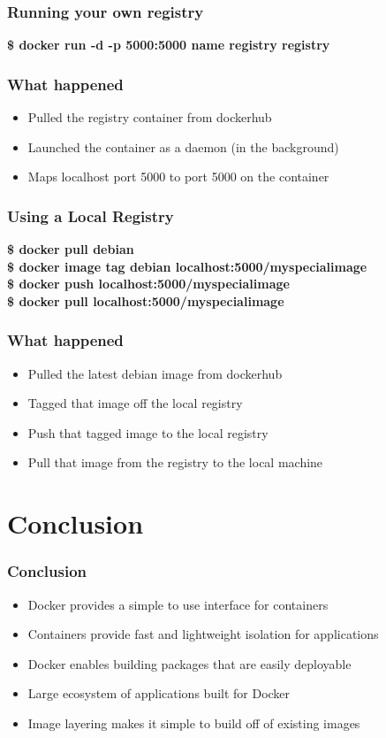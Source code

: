\documentclass[aspectratio=169,11pt,hyperref={colorlinks=true}]{beamer}
\begin{document}
\begin{frame}
    \frametitle{Running your own registry}
    {\Large \textbf{\$ docker run -d -p 5000:5000 \-\-name registry registry}}
\end{frame}

\begin{frame}
    \frametitle{What happened}
    \begin{itemize}
        \item Pulled the registry container from dockerhub
        \item Launched the container as a daemon (in the background)
        \item Maps localhost port 5000 to port 5000 on the container
    \end{itemize}
\end{frame}

\begin{frame}
    \frametitle{Using a Local Registry}
    \textbf{\$ docker pull debian} \\
    \textbf{\$ docker image tag debian localhost:5000/myspecialimage} \\
    \textbf{\$ docker push localhost:5000/myspecialimage} \\
    \textbf{\$ docker pull localhost:5000/myspecialimage}
\end{frame}

\begin{frame}
    \frametitle{What happened}
    \begin{itemize}
        \item Pulled the latest debian image from dockerhub
        \item Tagged that image off the local registry
        \item Push that tagged image to the local registry
        \item Pull that image from the registry to the local machine
    \end{itemize}
\end{frame}

\section{Conclusion}
\begin{frame}
    \frametitle{Conclusion}
    \begin{itemize}
        \item Docker provides a simple to use interface for containers
        \item Containers provide fast and lightweight isolation for applications
        \item Docker enables building packages that are easily deployable
        \item Large ecosystem of applications built for Docker
        \item Image layering makes it simple to build off of existing images
    \end{itemize}
\end{frame}
\end{document}
